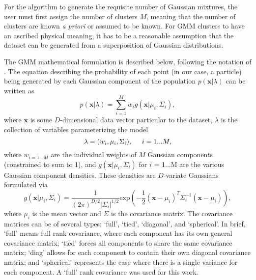 \documentclass[fleqn,usenatbib,useAMS]{mnras}
\begin{document}
For the algorithm to generate the requisite number of Gaussian mixtures, the user must first assign the number of clusters $M$, meaning that the number of clusters are known \textit{a priori} or assumed to be known. For GMM clusters to have an ascribed physical meaning, it has to be a reasonable assumption that the dataset can be generated from a superposition of Gaussian distributions. \par

The GMM mathematical formulation is described below, following the notation of \citep{Reynolds09}. The equation describing the probability of each point (in our case, a particle) being generated by each Gaussian component of the population $p(\textbf{x}|\lambda)$ can be written as 
%
\begin{equation}
    p(\textbf{x}|\lambda) = \sum_{i=1}^{M} w_i  g(\textbf{x}|\mu_i, \Sigma_i),
\end{equation}
%
where $\textbf{x}$ is some $D$-dimensional data vector particular to the dataset, $\lambda$ is the collection of variables parameterizing the model
%
\begin{equation}
    \lambda = (w_i, \mu_i, \Sigma_i), \hspace{0.5cm} i = 1...M,
\end{equation}
%
where $w_{i=1...M}$ are the individual weights of $M$  Gaussian components (constrained to sum to 1), and $g(\textbf{x}|\mu_{i}, \Sigma_{i})$ for $i$ = 1...M are the various Gaussian component densities. These densities are $D$-variate Gaussians formulated via
%
\begin{equation}
    g(\textbf{x}|\mu_i, \Sigma_i) = \frac{1}{(2\pi)^{D/2} |\Sigma_i|^{1/2}} \text{exp}\left( -\frac{1}{2} (\textbf{x}-\mu_i)^T \Sigma_i^{-1} (\textbf{x}-\mu_i) \right),
\end{equation}
%
where $\mu_i$ is the mean vector and $\Sigma$ is the covariance matrix. The covariance matrices can be of several types: `full', `tied', `diagonal', and `spherical'. In brief, `full' means full rank covariance, where each component has its own general covariance matrix; `tied' forces all components to share the same covariance matrix; `diag' allows for each component to contain their own diagonal covariance matrix; and `spherical' represents the case where there is a single variance for each component. A `full' rank covariance was used for this work. \par 
\end{document}
